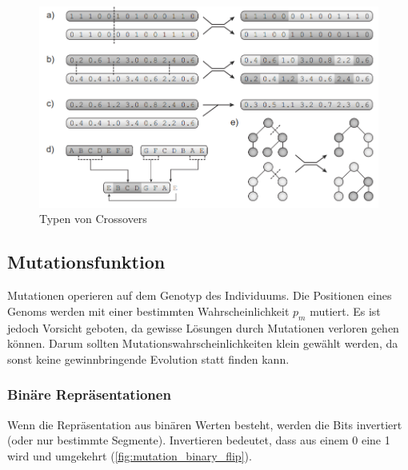         \begin{figure}[H]
          \includegraphics[scale=0.7, center]{graphics/crossover_types}
          \caption{Typen von Crossovers\cite[S.27]{book:bioInspired} \label{fig:crossTypes}}
        \end{figure}
    \subsection{Mutationsfunktion}

      Mutationen operieren auf dem Genotyp des Individuums.
      Die Positionen eines Genoms werden mit einer bestimmten Wahrscheinlichkeit \(p_{m}\) mutiert.
      Es ist jedoch Vorsicht geboten, da gewisse Lösungen durch Mutationen verloren gehen können.
      Darum sollten Mutationswahrscheinlichkeiten klein gewählt werden, da sonst keine gewinnbringende Evolution statt finden kann.

      \subsubsection{Binäre Repräsentationen}

        Wenn die Repräsentation aus binären Werten besteht, werden die Bits invertiert (oder nur bestimmte Segmente).
        Invertieren bedeutet, dass aus einem 0 eine 1 wird und umgekehrt (\vref{fig:mutation_binary_flip}).

